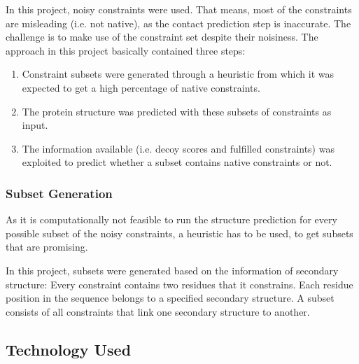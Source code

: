 \documentclass[a4paper, 11pt, parskip=half]{scrartcl}
\begin{document}
In this project, noisy constraints were used.
That means, most of the constraints are misleading (i.e. not native),
as the contact prediction step is inaccurate.
The challenge is to make use of the constraint set despite their noisiness.
The approach in this project basically contained three steps:
\begin{enumerate}
	\item Constraint subsets
	were generated through a heuristic from which it was expected to get
	a high percentage of native constraints.

	\item The protein structure was predicted with these subsets of constraints as input.

	\item The information available (i.e. decoy scores and fulfilled constraints)
	was exploited to predict whether a subset
	contains native constraints or not.
\end{enumerate}

\subsubsection*{Subset Generation}
As it is computationally not feasible to run the structure prediction
for every possible subset of the noisy constraints,
a heuristic has to be used, to get subsets that are promising.

In this project, subsets were generated based on the information of secondary structure:
Every constraint contains two residues that it constrains.
Each residue position in the sequence belongs to a specified secondary structure.
A subset consists of all constraints that link one secondary structure to another.



\subsection{Technology Used}
\end{document}
